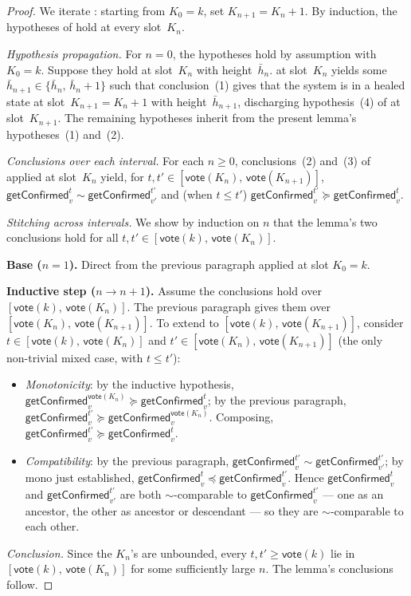 \documentclass{article}
\newcommand{\vote}{\mathsf{vote}}
\newcommand{\comm}[1]{\bar{#1}}
\newcommand{\getConfirmed}{\textsf{getConfirmed}\xspace}
\theoremstyle{plain}
\theoremstyle{definition}
\theoremstyle{remark}
\begin{document}
\begin{proof}
We iterate : starting from $K_0 = k$, set $K_{n+1} = K_n + 1$. By induction, the hypotheses of  hold at every slot~$K_n$.

\emph{Hypothesis propagation.}
For $n = 0$, the hypotheses hold by assumption with $K_0 = k$. Suppose they hold at slot~$K_n$ with height~$\comm{h}_n$.  at slot~$K_n$ yields some $\comm{h}_{n+1} \in \{\comm{h}_n,\, \comm{h}_n + 1\}$ such that conclusion~(1) gives that the system is in a healed state at slot~$K_{n+1} = K_n + 1$ with height~$\comm{h}_{n+1}$, discharging hypothesis~(4) of  at slot~$K_{n+1}$. The remaining hypotheses inherit from the present lemma's hypotheses~(1) and~(2).

\emph{Conclusions over each interval.}
For each $n \geq 0$, conclusions~(2) and~(3) of  applied at slot~$K_n$ yield, for $t, t' \in [\vote(K_n),\, \vote(K_{n+1})]$, $\getConfirmed_v^t \sim \getConfirmed_{v'}^{t'}$ and (when $t \leq t'$) $\getConfirmed_v^{t'} \succeq \getConfirmed_v^t$.

\emph{Stitching across intervals.}
We show by induction on $n$ that the lemma's two conclusions hold for all $t, t' \in [\vote(k),\, \vote(K_n)]$.

\textbf{Base ($n = 1$).}
Direct from the previous paragraph applied at slot $K_0 = k$.

\textbf{Inductive step ($n \to n+1$).}
Assume the conclusions hold over $[\vote(k),\, \vote(K_n)]$. The previous paragraph gives them over $[\vote(K_n),\, \vote(K_{n+1})]$. To extend to $[\vote(k),\, \vote(K_{n+1})]$, consider $t \in [\vote(k),\, \vote(K_n)]$ and $t' \in [\vote(K_n),\, \vote(K_{n+1})]$ (the only non-trivial mixed case, with $t \leq t'$):
\begin{itemize}
  \item \emph{Monotonicity}: by the inductive hypothesis, $\getConfirmed_v^{\vote(K_n)} \succeq \getConfirmed_v^t$; by the previous paragraph, $\getConfirmed_v^{t'} \succeq \getConfirmed_v^{\vote(K_n)}$. Composing, $\getConfirmed_v^{t'} \succeq \getConfirmed_v^t$.
  \item \emph{Compatibility}: by the previous paragraph, $\getConfirmed_v^{t'} \sim \getConfirmed_{v'}^{t'}$; by mono just established, $\getConfirmed_v^t \preceq \getConfirmed_v^{t'}$. Hence $\getConfirmed_v^t$ and $\getConfirmed_{v'}^{t'}$ are both $\sim$-comparable to $\getConfirmed_v^{t'}$ — one as an ancestor, the other as ancestor or descendant — so they are $\sim$-comparable to each other.
\end{itemize}

\emph{Conclusion.}
Since the $K_n$'s are unbounded, every $t, t' \geq \vote(k)$ lie in $[\vote(k),\, \vote(K_n)]$ for some sufficiently large $n$. The lemma's conclusions follow.
\end{proof}
\end{document}
